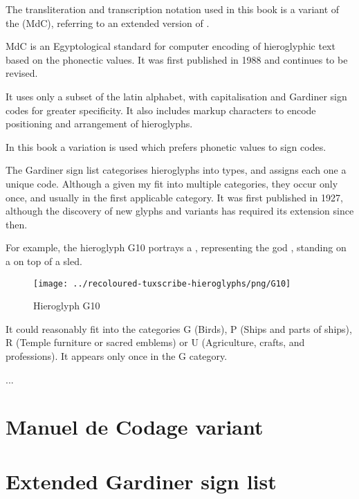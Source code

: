 The transliteration and transcription notation used in this book is a variant of the \textit{} (MdC), referring to an extended version of \textit{}.

MdC is an Egyptological standard for computer encoding of hieroglyphic text based on the phonectic values. It was first published in 1988 and continues to be revised.

It uses only a subset of the latin alphabet, with capitalisation and Gardiner sign codes for greater specificity. It also includes markup characters to encode positioning and arrangement of hieroglyphs.

In this book a variation is used which prefers phonetic values to sign codes.

The Gardiner sign list categorises hieroglyphs into types, and assigns each one a unique code. Although a given  my fit into multiple categories, they occur only once, and usually in the first applicable category. It was first published in 1927, although the discovery of new glyphs and variants has required its extension since then.

For example, the hieroglyph G10 portrays a , representing the god , standing on a  on top of a sled.

\begin{figure} [H]
\centering
\texttt{[image: ../recoloured-tuxscribe-hieroglyphs/png/G10]}
\caption{Hieroglyph G10}
\end{figure}

It could reasonably fit into the categories G (Birds), P (Ships and parts of ships), R (Temple furniture or sacred emblems) or U (Agriculture, crafts, and professions). It appears only once in the G category.

...

\section*{Manuel de Codage variant}

\section*{Extended Gardiner sign list}
